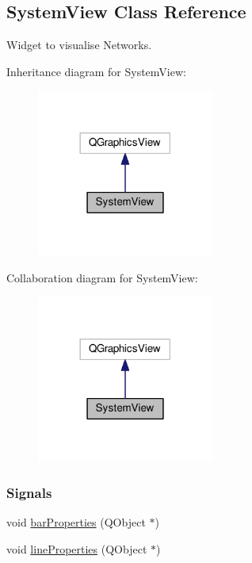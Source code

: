 \hypertarget{class_system_view}{}\subsection{System\+View Class Reference}
\label{class_system_view}


Widget to visualise Networks.  




Inheritance diagram for System\+View\+:\nopagebreak
\begin{figure}[H]
\begin{center}
\leavevmode
\includegraphics[width=165pt]{class_system_view__inherit__graph}
\end{center}
\end{figure}


Collaboration diagram for System\+View\+:\nopagebreak
\begin{figure}[H]
\begin{center}
\leavevmode
\includegraphics[width=165pt]{class_system_view__coll__graph}
\end{center}
\end{figure}
\subsubsection*{Signals}
\begin{DoxyCompactItemize}
\item 
void \hyperlink{class_system_view_a90bd4b070c8abaa5995899154421eb44}{bar\+Properties} (Q\+Object $\ast$)
\item 
void \hyperlink{class_system_view_a58c4a0bf68178ab59066819118214360}{line\+Properties} (Q\+Object $\ast$)
\end{DoxyCompactItemize}
